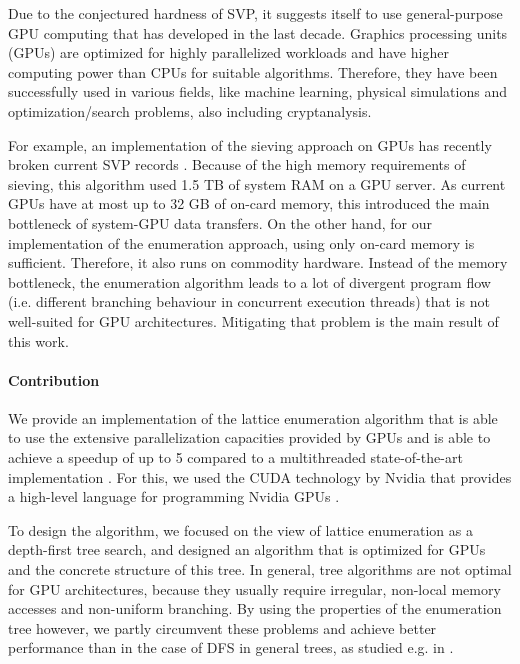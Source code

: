 \documentclass{scrartcl}
\begin{document}
    Due to the conjectured hardness of SVP, it suggests itself to use general-purpose GPU computing that has developed in the last decade.
    Graphics processing units (GPUs) are optimized for highly parallelized workloads and have higher computing power than CPUs for suitable algorithms.
    Therefore, they have been successfully used in various fields, like machine learning, physical simulations and optimization/search problems, also including cryptanalysis.
    
    For example, an implementation of the sieving approach on GPUs has recently broken current SVP records \cite{sieving_gpu}.
    Because of the high memory requirements of sieving, this algorithm used 1.5 TB of system RAM on a GPU server. As current GPUs have at most up to 32 GB of on-card memory, this introduced the main bottleneck of system-GPU data transfers.
    On the other hand, for our implementation of the enumeration approach, using only on-card memory is sufficient. Therefore, it also runs on commodity hardware.
    Instead of the memory bottleneck, the enumeration algorithm leads to a lot of divergent program flow (i.e. different branching behaviour in concurrent execution threads) that is not well-suited for GPU architectures.
    Mitigating that problem is the main result of this work.

    \paragraph{Contribution}
    We provide an implementation of the lattice enumeration algorithm that is able to use the extensive parallelization capacities provided by GPUs and is able to achieve a speedup of up to 5 compared to a multithreaded state-of-the-art implementation \cite{fplll}.
    For this, we used the CUDA technology by Nvidia that provides a high-level language for programming Nvidia GPUs \cite{cuda}.
    
    To design the algorithm, we focused on the view of lattice enumeration as a depth-first tree search, and designed an algorithm that is optimized for GPUs and the concrete structure of this tree. 
    In general, tree algorithms are not optimal for GPU architectures, because they usually require irregular, non-local memory accesses and non-uniform branching.
    By using the properties of the enumeration tree however, we partly circumvent these problems and achieve better performance than in the case of DFS in general trees, as studied e.g. in \cite{tree_search_cuda}.
\end{document}
